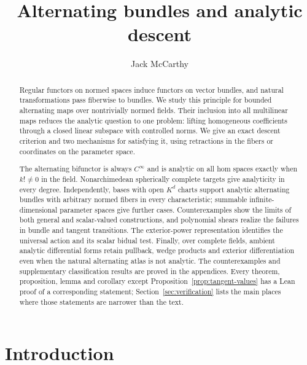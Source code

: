 \documentclass[11pt]{amsart}
\title{Alternating bundles and analytic descent}
\author{Jack McCarthy}
\theoremstyle{definition}
\theoremstyle{remark}
\numberwithin{equation}{section}
\begin{document}
\begin{abstract}
Regular functors on normed spaces induce functors on vector bundles, and natural transformations pass
fiberwise to bundles. We study this principle for bounded alternating maps over nontrivially normed
fields. Their inclusion into all multilinear maps reduces the analytic question to one problem:
lifting homogeneous coefficients through a closed linear subspace with controlled norms.
We give an exact descent criterion and two mechanisms for satisfying it, using retractions in the
fibers or coordinates on the parameter space.

The alternating bifunctor is always $C^\infty$ and is analytic on all hom spaces exactly when $k!\ne0$ in the field.
Nonarchimedean spherically complete targets give analyticity in every degree. Independently, bases
with open $K^d$ charts support analytic alternating bundles with arbitrary normed fibers in every
characteristic; summable infinite-dimensional parameter spaces give further cases.
Counterexamples show the limits of both general and scalar-valued constructions, and polynomial
shears realize the failures in bundle and tangent transitions.
The exterior-power representation identifies the universal action and its scalar bidual test.
Finally, over complete fields, ambient analytic differential forms retain pullback, wedge products
and exterior differentiation even when the natural alternating atlas is not analytic.
The counterexamples and supplementary classification results are proved in the appendices.
Every theorem, proposition, lemma and corollary except Proposition~\ref{prop:tangent-values} has a
Lean proof of a corresponding statement; Section~\ref{sec:verification} lists the main places where those statements
are narrower than the text.
\end{abstract}
\maketitle
\setcounter{tocdepth}{1}
\begingroup
\small
\linespacing=8pt
\tableofcontents\removelastskip
\endgroup
\clearpage

\section{Introduction}\label{sec:intro}
\end{document}
